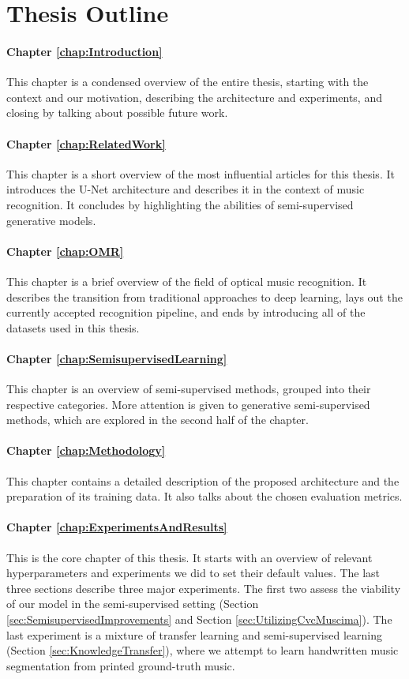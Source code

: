 \section{Thesis Outline}

\paragraph*{Chapter \ref{chap:Introduction}} This chapter is a condensed overview of the entire thesis, starting with the context and our motivation, describing the architecture and experiments, and closing by talking about possible future work.

\paragraph*{Chapter \ref{chap:RelatedWork}} This chapter is a short overview of the most influential articles for this thesis. It introduces the U-Net architecture and describes it in the context of music recognition. It concludes by highlighting the abilities of semi-supervised generative models.

\paragraph*{Chapter \ref{chap:OMR}} This chapter is a brief overview of the field of optical music recognition. It describes the transition from traditional approaches to deep learning, lays out the currently accepted recognition pipeline, and ends by introducing all of the datasets used in this thesis.

\paragraph*{Chapter \ref{chap:SemisupervisedLearning}} This chapter is an overview of semi-supervised methods, grouped into their respective categories. More attention is given to generative semi-supervised methods, which are explored in the second half of the chapter.

\paragraph*{Chapter \ref{chap:Methodology}} This chapter contains a detailed description of the proposed architecture and the preparation of its training data. It also talks about the chosen evaluation metrics.

\paragraph*{Chapter \ref{chap:ExperimentsAndResults}} This is the core chapter of this thesis. It starts with an overview of relevant hyperparameters and experiments we did to set their default values. The last three sections describe three major experiments. The first two assess the viability of our model in the semi-supervised setting (Section \ref{sec:SemisupervisedImprovements} and Section \ref{sec:UtilizingCvcMuscima}). The last experiment is a mixture of transfer learning and semi-supervised learning (Section \ref{sec:KnowledgeTransfer}), where we attempt to learn handwritten music segmentation from printed ground-truth music.
